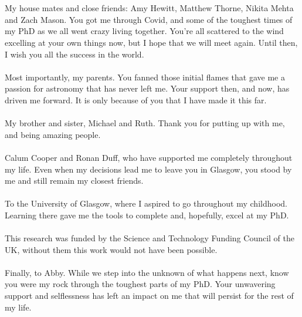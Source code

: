 \begin{acknowledgements}
\\
\\
My house mates and close friends: Amy Hewitt, Matthew Thorne, Nikita Mehta and Zach Mason. You got me through Covid, and some of the toughest times of my PhD as we all went crazy living together. You're all scattered to the wind excelling at your own things now, but I hope that we will meet again. Until then, I wish you all the success in the world.
\\
\\
Most importantly, my parents. You fanned those initial flames that gave me a passion for astronomy that has never left me. Your support then, and now, has driven me forward. It is only because of you that I have made it this far.
\\
\\
My brother and sister, Michael and Ruth. Thank you for putting up with me, and being amazing people.
\\
\\
Calum Cooper and Ronan Duff, who have supported me completely throughout my life. Even when my decisions lead me to leave you in Glasgow, you stood by me and still remain my closest friends.
\\
\\
To the University of Glasgow, where I aspired to go throughout my childhood. Learning there gave me the tools to complete and, hopefully, excel at my PhD.
\\
\\
This research was funded by the Science and Technology Funding Council of the UK, without them this work would not have been possible.
\\
\\
Finally, to Abby. While we step into the unknown of what happens next, know you were my rock through the toughest parts of my PhD. Your unwavering support and selflessness has left an impact on me that will persist for the rest of my life.

\end{acknowledgements}

